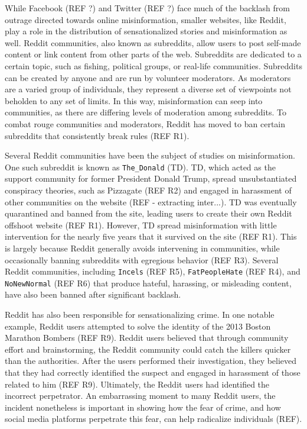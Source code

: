 \documentclass[12pt,oneside, letterpaper]{book}
\begin{document}
\par While Facebook (REF ?) and Twitter (REF ?) face much of the backlash from outrage directed towards online misinformation, smaller websites, like Reddit, play a role in the distribution of sensationalized stories and misinformation as well. Reddit communities, also known as subreddits, allow users to post self-made content or link content from other parts of the web. Subreddits are dedicated to a certain topic, such as fishing, political groups, or real-life communities. Subreddits can be created by anyone and are run by volunteer moderators. As moderators are a varied group of individuals, they represent a diverse set of viewpoints not beholden to any set of limits. In this way, misinformation can seep into communities, as there are differing levels of moderation among subreddits. To combat rouge communities and moderators, Reddit has moved to ban certain subreddits that consistently break rules (REF R1).

\par Several Reddit communities have been the subject of studies on misinformation. One such subreddit is known as \texttt{The\_Donald} (TD). TD, which acted as the support community for former President Donald Trump, spread unsubstantiated conspiracy theories, such as Pizzagate (REF R2) and engaged in harassment of other communities on the website (REF - extracting inter...). TD was eventually quarantined and banned from the site, leading users to create their own Reddit offshoot website (REF R1). However, TD spread misinformation with little intervention for the nearly five years that it survived on the site (REF R1). This is largely because Reddit generally avoids intervening in communities, while occasionally banning subreddits with egregious behavior (REF R3). Several Reddit communities, including \texttt{Incels} (REF R5), \texttt{FatPeopleHate} (REF R4), and \texttt{NoNewNormal} (REF R6) that produce hateful, harassing, or misleading content, have also been banned after significant backlash.

\par Reddit has also been responsible for sensationalizing crime. In one notable example, Reddit users attempted to solve the identity of the 2013 Boston Marathon Bombers (REF R9). Reddit users believed that through community effort and brainstorming, the Reddit community could catch the killers quicker than the authorities. After the users performed their investigation, they believed that they had correctly identified the suspect and engaged in harassment of those related to him (REF R9). Ultimately, the Reddit users had identified the incorrect perpetrator. An embarrassing moment to many Reddit users, the incident nonetheless is important in showing how the fear of crime, and how social media platforms perpetrate this fear, can help radicalize individuals (REF).
\end{document}
